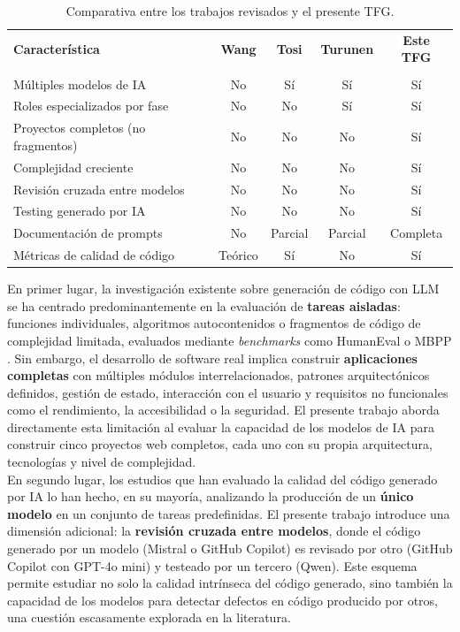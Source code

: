 \begin{table}[htbp]
\centering
\begin{tabular}{lcccc}
\hline
\textbf{Característica} & \textbf{Wang} & \textbf{Tosi} & \textbf{Turunen} & \textbf{Este TFG} \\
 & \cite{Wang:2023:LLMReview} & \cite{Tosi:2024:CodeQuality} & \cite{Turunen:2023:FromIdeas} & \\
\hline
Múltiples modelos de IA          & No  & Sí  & Sí  & Sí \\
Roles especializados por fase    & No  & No  & Sí  & Sí \\
Proyectos completos (no fragmentos) & No  & No  & No  & Sí \\
Complejidad creciente            & No  & No  & No  & Sí \\
Revisión cruzada entre modelos   & No  & No  & No  & Sí \\
Testing generado por IA          & No  & No  & No  & Sí \\
Documentación de prompts         & No  & Parcial & Parcial & Completa \\
Métricas de calidad de código    & Teórico & Sí  & No  & Sí \\
\hline
\end{tabular}
\caption{Comparativa entre los trabajos revisados y el presente TFG.}
\label{tab:comparativa-trabajos}
\end{table}

En primer lugar, la investigación existente sobre generación de código con \ac{LLM} se ha centrado predominantemente en la evaluación de \textbf{tareas aisladas}: funciones individuales, algoritmos autocontenidos o fragmentos de código de complejidad limitada, evaluados mediante \textit{benchmarks} como HumanEval o MBPP \cite{Wang:2023:LLMReview}. Sin embargo, el desarrollo de software real implica construir \textbf{aplicaciones completas} con múltiples módulos interrelacionados, patrones arquitectónicos definidos, gestión de estado, interacción con el usuario y requisitos no funcionales como el rendimiento, la accesibilidad o la seguridad. El presente trabajo aborda directamente esta limitación al evaluar la capacidad de los modelos de \ac{IA} para construir cinco proyectos web completos, cada uno con su propia arquitectura, tecnologías y nivel de complejidad.\\

En segundo lugar, los estudios que han evaluado la calidad del código generado por \ac{IA} \cite{Tosi:2024:CodeQuality} lo han hecho, en su mayoría, analizando la producción de un \textbf{único modelo} en un conjunto de tareas predefinidas. El presente trabajo introduce una dimensión adicional: la \textbf{revisión cruzada entre modelos}, donde el código generado por un modelo (Mistral o GitHub Copilot) es revisado por otro (GitHub Copilot con GPT-4o mini) y testeado por un tercero (Qwen). Este esquema permite estudiar no solo la calidad intrínseca del código generado, sino también la capacidad de los modelos para detectar defectos en código producido por otros, una cuestión escasamente explorada en la literatura.\\

